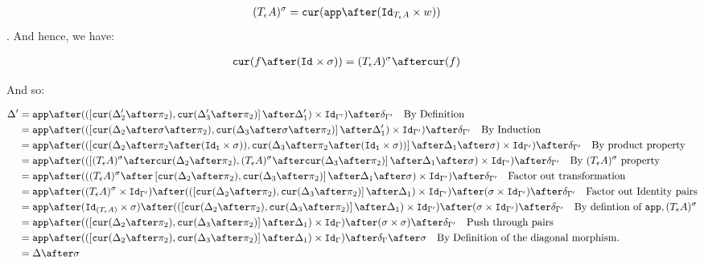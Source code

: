 {\begin{align}
    (\tea)^{\si} & = \cur{\app\after(\Id{\tea}\times w)}
\end{align}.
And hence, we have:

\begin{align}
    \cur{f\after(\Id{}\times \si)} & = (\tea)^{\si} \after\cur{f}
\end{align}

And so:

\begin{align}
    \D' & =\app\after((\fld{\cur{\D_2'\after\pp}}{\cur{\D_3'\after\pp}}\after\D_1')\times \Id{\G'})\after\diag{\G'}\qt{By Definition}\\
    & =\app\after((\fld{\cur{\D_2\after\si\after\pp}}{\cur{\D_3\after\si\after\pp}}\after\D_1')\times \Id{\G'})\after\diag{\G'}\qt{By Induction}\\
    & = \app\after((\fld{\cur{\D_2\after\pp\after(\Id{\1}\times \si)}}{\cur{\D_3\after\pp\after(\Id{\1}\times \si)}}\after\D_1\after\si)\times \Id{\G'})\after\diag{\G'}\qt{By product property}\\
    & = \app\after((\fld{(\tea)^{\si}\after\cur{\D_2\after\pp}}{(\tea)^{\si}\after\cur{\D_3\after\pp}}\after\D_1\after\si)\times \Id{\G'})\after\diag{\G'}\qt{By $(\tea)^{\si}$ property}\\
    & = \app\after(((\tea)^{\si}\after\fld{\cur{\D_2\after\pp}}{\cur{\D_3\after\pp}}\after\D_1\after\si)\times \Id{\G'})\after\diag{\G'}\qt{Factor out transformation}\\
    & = \app\after((\tea)^{\si}\times\Id{\G'})\after((\fld{\cur{\D_2\after\pp}}{\cur{\D_3\after\pp}}\after\D_1)\times \Id{\G'})\after(\si \times \Id{\G'})\after\diag{\G'}\qt{Factor out Identity pairs}\\
    & = \app\after(\Id{(\tea)}\times\si)\after((\fld{\cur{\D_2\after\pp}}{\cur{\D_3\after\pp}}\after\D_1) \times \Id{\G'})\after(\si \times \Id{\G'})\after\diag{\G'}\qt{By defintion of $\app, (\tea)^{\si}$}\\
    & = \app\after((\fld{\cur{\D_2\after\pp}}{\cur{\D_3\after\pp}}\after\D_1)\times \idg)\after(\si \times \si)\after\diag{\G'}\qt{Push through pairs}\\
    & = \app\after((\fld{\cur{\D_2\after\pp}}{\cur{\D_3\after\pp}}\after\D_1)\times \idg)\after\diag{\G}\after\si\qt{By Definition of the diagonal morphism.}\\
    & = \D\after\si
\end{align}



}
